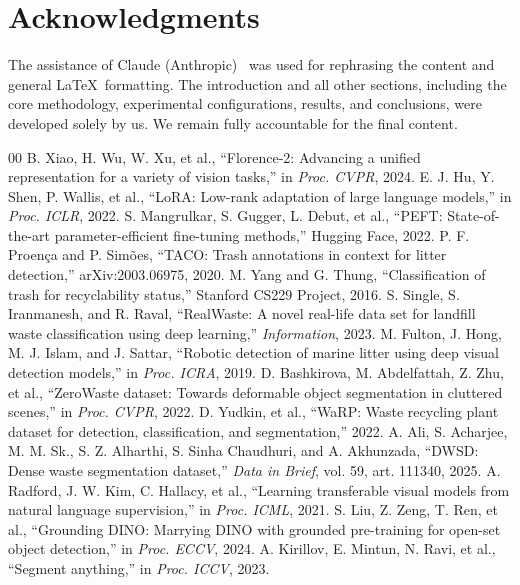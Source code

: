 \documentclass[conference]{IEEEtran}
\begin{document}
\label{sec:ack}
\section*{Acknowledgments}
The assistance of Claude (Anthropic)~\cite{claude} was used for rephrasing the content and general \LaTeX\ formatting. The introduction and all other sections,
including the core methodology, experimental configurations, results, and
conclusions, were developed solely by us. We remain fully accountable
for the final content.

\begin{thebibliography}{00}
 B. Xiao, H. Wu, W. Xu, et al., ``Florence-2: Advancing a unified representation for a variety of vision tasks,'' in \textit{Proc. CVPR}, 2024.
 E. J. Hu, Y. Shen, P. Wallis, et al., ``LoRA: Low-rank adaptation of large language models,'' in \textit{Proc. ICLR}, 2022.
 S. Mangrulkar, S. Gugger, L. Debut, et al., ``PEFT: State-of-the-art parameter-efficient fine-tuning methods,'' Hugging Face, 2022.
 P. F. Proen\c{c}a and P. Sim\~oes, ``TACO: Trash annotations in context for litter detection,'' arXiv:2003.06975, 2020.
 M. Yang and G. Thung, ``Classification of trash for recyclability status,'' Stanford CS229 Project, 2016.
 S. Single, S. Iranmanesh, and R. Raval, ``RealWaste: A novel real-life data set for landfill waste classification using deep learning,'' \textit{Information}, 2023.
 M. Fulton, J. Hong, M. J. Islam, and J. Sattar, ``Robotic detection of marine litter using deep visual detection models,'' in \textit{Proc. ICRA}, 2019.
 D. Bashkirova, M. Abdelfattah, Z. Zhu, et al., ``ZeroWaste dataset: Towards deformable object segmentation in cluttered scenes,'' in \textit{Proc. CVPR}, 2022.
 D. Yudkin, et al., ``WaRP: Waste recycling plant dataset for detection, classification, and segmentation,'' 2022.
 A. Ali, S. Acharjee, M. M. Sk., S. Z. Alharthi, S. Sinha Chaudhuri, and A. Akhunzada, ``DWSD: Dense waste segmentation dataset,'' \textit{Data in Brief}, vol. 59, art. 111340, 2025.
 A. Radford, J. W. Kim, C. Hallacy, et al., ``Learning transferable visual models from natural language supervision,'' in \textit{Proc. ICML}, 2021.
 S. Liu, Z. Zeng, T. Ren, et al., ``Grounding DINO: Marrying DINO with grounded pre-training for open-set object detection,'' in \textit{Proc. ECCV}, 2024.
 A. Kirillov, E. Mintun, N. Ravi, et al., ``Segment anything,'' in \textit{Proc. ICCV}, 2023.

\end{thebibliography}
\end{document}
